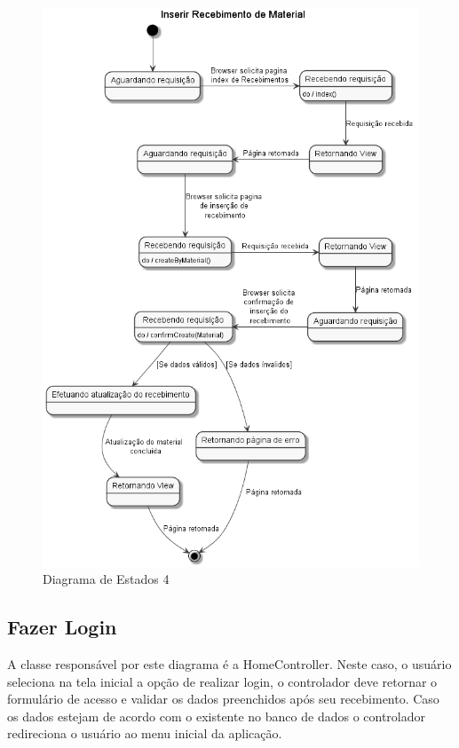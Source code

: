 \documentclass[rascunho,xindy,acronym,symbols]{fei}
\begin{document}
\begin{figure}[H]
    \centering
    \includegraphics[scale=0.6, width=400pt]{./Images/DE_-_Inserir_Recebimento_de_Material.png}
    \caption{Diagrama de Estados 4}
    \label{fig:diag_est4}
\end{figure}

\subsection{Fazer Login}

A classe responsável por este diagrama é a HomeController. Neste caso, o usuário seleciona na tela inicial a opção de realizar login, o controlador deve retornar o formulário de acesso e validar os dados preenchidos após seu recebimento. Caso os dados estejam de acordo com o existente no banco de dados o controlador redireciona o usuário ao menu inicial da aplicação.
\end{document}
